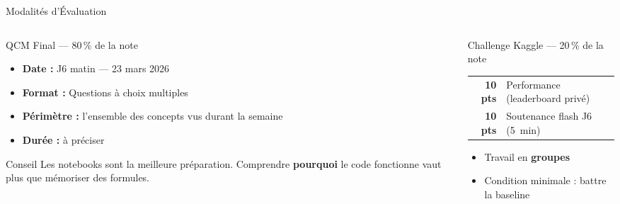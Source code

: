 \documentclass[aspectratio=169, 10pt]{beamer}
\begin{document}
\begin{frame}{Modalités d'Évaluation}
  \begin{columns}[T]
    \begin{column}{0.52\textwidth}
      \begin{block}{QCM Final --- 80\,\% de la note}
        \begin{itemize}
          \item \textbf{Date :} J6 matin --- 23 mars 2026
          \item \textbf{Format :} Questions à choix multiples
          \item \textbf{Périmètre :} l'ensemble des concepts
                vus durant la semaine
          \item \textbf{Durée :} à préciser
        \end{itemize}
      \end{block}
      \smallskip
      \begin{alertblock}{Conseil}
        Les notebooks sont la meilleure préparation.
        Comprendre \textbf{pourquoi} le code fonctionne
        vaut plus que mémoriser des formules.
      \end{alertblock}
    \end{column}
    \begin{column}{0.44\textwidth}
      \begin{block}{Challenge Kaggle --- 20\,\% de la note}
        \begin{tabular}{rl}
          \textbf{10 pts} & Performance (leaderboard privé)\\
          \textbf{10 pts} & Soutenance flash J6 (5~min)\\
        \end{tabular}
        \vspace{4pt}
        \begin{itemize}
          \item Travail en \textbf{groupes}
          \item Condition minimale : battre la baseline
        \end{itemize}
      \end{block}
    \end{column}
  \end{columns}
\end{frame}
\end{document}
